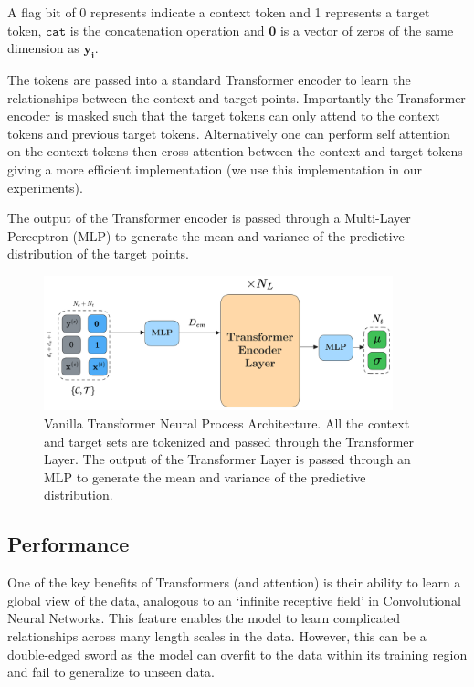 \documentclass[../../main.tex]{subfiles}
\begin{document}
A flag bit of 0 represents indicate a context token and 1 represents a target token, $\texttt{cat}$ is the concatenation operation and $\bm{0}$ is a vector of zeros of the same dimension as $\bm{y_i}$.

The tokens are passed into a standard Transformer encoder to learn the relationships between the context and target points. Importantly the Transformer encoder is masked such that the target tokens can only attend to the context tokens and previous target tokens. Alternatively one can perform self attention on the context tokens then cross attention between the context and target tokens giving a more efficient implementation \cite{feng2022efficient} (we use this implementation in our experiments).

The output of the Transformer encoder is passed through a Multi-Layer Perceptron (MLP) to generate the mean and variance of the predictive distribution of the target points. 


\begin{figure}[H]
	\centering
	\includegraphics[width=0.9\textwidth]{./tnp.png}
	\caption{Vanilla Transformer Neural Process Architecture. All the context and target sets are tokenized and passed through the Transformer Layer. The output of the Transformer Layer is passed through an MLP to generate the mean and variance of the predictive distribution.}
	\label{fig:tnp}
\end{figure}

\subsection{Performance}

One of the key benefits of Transformers (and attention) is their ability to learn a global view of the data, analogous to an `infinite receptive field' in Convolutional Neural Networks. This feature enables the model to learn complicated relationships across many length scales in the data. However, this can be a double-edged sword as the model can overfit to the data within its training region and fail to generalize to unseen data. 
\end{document}
